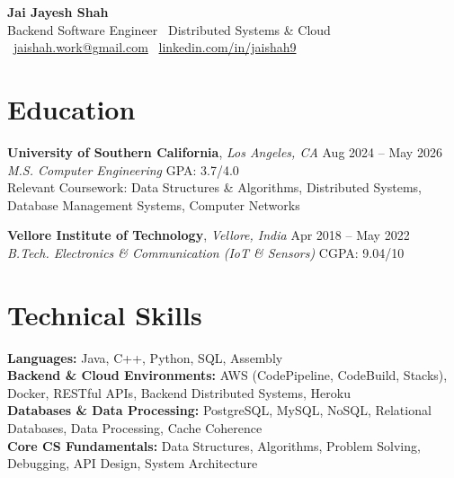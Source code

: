 \documentclass[letterpaper,11pt]{article}
\begin{document}
\begin{center}
    {\LARGE \textbf{Jai Jayesh Shah}}\\
    {\normalsize Backend Software Engineer \textbar\ Distributed Systems \& Cloud}\\
    \small
    \faEnvelope\ \href{mailto:jaishah.work@gmail.com}{jaishah.work@gmail.com}
    \quad
    \faLinkedin\ \href{https://www.linkedin.com/in/jaishah9}{linkedin.com/in/jaishah9}
\end{center}
\vspace{-16pt}


\section*{Education}
\textbf{University of Southern California}, \textit{Los Angeles, CA} \hfill Aug 2024 -- May 2026 \\
\textit{M.S. Computer Engineering} \hfill GPA: 3.7/4.0 \\
Relevant Coursework: Data Structures \& Algorithms, Distributed Systems, Database Management Systems, Computer Networks

\textbf{Vellore Institute of Technology}, \textit{Vellore, India }\hfill Apr 2018 -- May 2022 \\
\textit{B.Tech. Electronics \& Communication (IoT \& Sensors)} \hfill CGPA: 9.04/10


\section*{Technical Skills}
\textbf{Languages:} Java, C++, Python, SQL, Assembly \\
\textbf{Backend \& Cloud Environments:} AWS (CodePipeline, CodeBuild, Stacks), Docker, RESTful APIs, Backend Distributed Systems, Heroku \\
\textbf{Databases \& Data Processing:} PostgreSQL, MySQL, NoSQL, Relational Databases, Data Processing, Cache Coherence \\
\textbf{Core CS Fundamentals:} Data Structures, Algorithms, Problem Solving, Debugging, API Design, System Architecture


\end{document}
